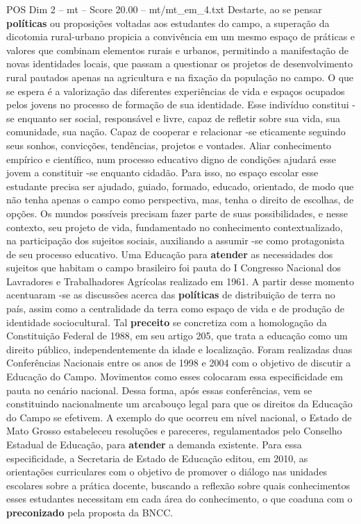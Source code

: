 \begin{textsample}{POS Dim 2 – mt – Score 20.00 – mt/mt\_em\_4.txt}
Destarte, ao se pensar \textbf{políticas} ou proposições voltadas aos estudantes do campo, a superação da dicotomia rural-urbano propicia a convivência em um mesmo espaço de práticas e valores que combinam elementos rurais e urbanos, permitindo a manifestação de novas identidades locais, que passam a questionar os projetos de desenvolvimento rural pautados apenas na agricultura e na fixação da população no campo.
O que se espera é a valorização das diferentes experiências de vida e espaços ocupados pelos jovens no processo de formação de sua identidade.
Esse indivíduo constitui -se enquanto ser social, responsável e livre, capaz de refletir sobre sua vida, sua comunidade, sua nação.
Capaz de cooperar e relacionar -se eticamente seguindo seus sonhos, convicções, tendências, projetos e vontades.
Aliar conhecimento empírico e científico, num processo educativo digno de condições ajudará esse jovem a constituir -se enquanto cidadão.
Para isso, no espaço escolar esse estudante precisa ser ajudado, guiado, formado, educado, orientado, de modo que não tenha apenas o campo como perspectiva, mas, tenha o direito de escolhas, de opções.
Os mundos possíveis precisam fazer parte de suas possibilidades, e nesse contexto, seu projeto de vida, fundamentado no conhecimento contextualizado, na participação dos sujeitos sociais, auxiliando a assumir -se como protagonista de seu processo educativo.
Uma Educação para \textbf{atender} as necessidades dos sujeitos que habitam o campo brasileiro foi pauta do I Congresso Nacional dos Lavradores e Trabalhadores Agrícolas realizado em 1961.
A partir desse momento acentuaram -se as discussões acerca das \textbf{políticas} de distribuição de terra no país, assim como a centralidade da terra como espaço de vida e de produção de identidade sociocultural.
Tal \textbf{preceito} se concretiza com a homologação da Constituição Federal de 1988, em seu artigo 205, que trata a educação como um direito público, independentemente da idade e localização.
Foram realizadas duas Conferências Nacionais entre os anos de 1998 e 2004 com o objetivo de discutir a Educação do Campo.
Movimentos como esses colocaram essa especificidade em pauta no cenário nacional.
Dessa forma, após essas conferências, vem se constituindo nacionalmente um arcabouço legal para que os direitos da Educação do Campo se efetivem.
A exemplo do que ocorreu em nível nacional, o Estado de Mato Grosso estabeleceu resoluções e pareceres, regulamentados pelo Conselho Estadual de Educação, para \textbf{atender} a demanda existente.
Para essa especificidade, a Secretaria de Estado de Educação editou, em 2010, as orientações curriculares com o objetivo de promover o diálogo nas unidades escolares sobre a prática docente, buscando a reflexão sobre quais conhecimentos esses estudantes necessitam em cada área do conhecimento, o que coaduna com o \textbf{preconizado} pela proposta da BNCC.

\end{textsample}

